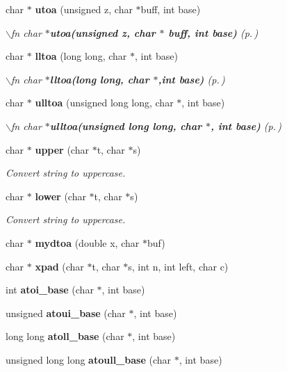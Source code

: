 \begin{CompactItemize}
char $\ast$ {\bf utoa} (unsigned z, char $\ast$buff, int base)
\begin{CompactList}\small\item\em $\backslash$fn char $\ast${\bf utoa(unsigned z, char $\ast$ buff, int base)} {\rm (p.\,\pageref{hpstring_8h_a9})}\item\end{CompactList}\item 
char $\ast$ {\bf lltoa} (long long, char $\ast$, int base)
\begin{CompactList}\small\item\em $\backslash$fn char $\ast${\bf lltoa(long long, char $\ast$,int base)} {\rm (p.\,\pageref{hpstring_8h_a10})}\item\end{CompactList}\item 
char $\ast$ {\bf ulltoa} (unsigned long long, char $\ast$, int base)
\begin{CompactList}\small\item\em $\backslash$fn char $\ast${\bf ulltoa(unsigned long long, char $\ast$, int base)} {\rm (p.\,\pageref{hpstring_8h_a11})}\item\end{CompactList}\item 
char $\ast$ {\bf upper} (char $\ast$t, char $\ast$s)
\begin{CompactList}\small\item\em Convert string to uppercase.\item\end{CompactList}\item 
char $\ast$ {\bf lower} (char $\ast$t, char $\ast$s)
\begin{CompactList}\small\item\em Convert string to uppercase.\item\end{CompactList}\item 
char $\ast$ {\bf mydtoa} (double x, char $\ast$buf)
\item 
char $\ast$ {\bf xpad} (char $\ast$t, char $\ast$s, int n, int left, char c)
\item 
int {\bf atoi\_\-base} (char $\ast$, int base)
\item 
unsigned {\bf atoui\_\-base} (char $\ast$, int base)
\item 
long long {\bf atoll\_\-base} (char $\ast$, int base)
\item 
unsigned long long {\bf atoull\_\-base} (char $\ast$, int base)
\item 

\end{CompactItemize}

